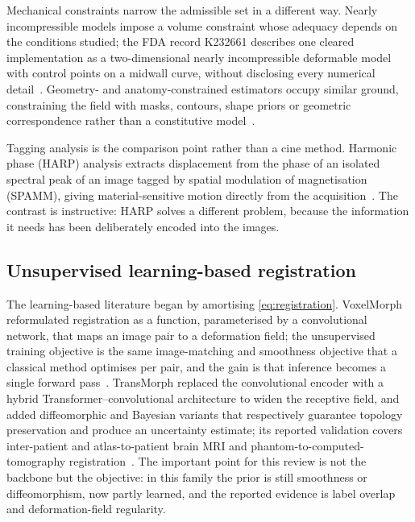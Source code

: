 Mechanical constraints narrow the admissible set in a different way. Nearly incompressible models
impose a volume constraint whose adequacy depends on the conditions studied; the FDA record K232661
describes one cleared implementation as a two-dimensional nearly incompressible deformable model
with control points on a midwall curve, without disclosing every numerical
detail~\citep{fdaK232661}. Geometry- and anatomy-constrained estimators occupy similar ground,
constraining the field with masks, contours, shape priors or geometric correspondence rather than a
constitutive model~\citep{chen2020anatomy,hammouda2020}.

Tagging analysis is the comparison point rather than a cine method. Harmonic phase (HARP) analysis
extracts displacement from the phase of an isolated spectral peak of an image tagged by spatial
modulation of magnetisation (SPAMM), giving material-sensitive
motion directly from the acquisition~\citep{osman2000harp}. The contrast is instructive: HARP solves
a different problem, because the information it needs has been deliberately encoded into the images.

\subsection{Unsupervised learning-based registration}\label{sec:unsupervised}

The learning-based literature began by amortising \cref{eq:registration}. VoxelMorph reformulated
registration as a function, parameterised by a convolutional network, that maps an image pair to a
deformation field; the unsupervised training objective is the same image-matching and smoothness
objective that a classical method optimises per pair, and the gain is that inference becomes a
single forward pass~\citep{balakrishnan2019voxelmorph}. TransMorph replaced the convolutional
encoder with a hybrid Transformer--convolutional architecture to widen the receptive field, and
added diffeomorphic and Bayesian variants that respectively guarantee topology preservation and
produce an uncertainty estimate; its reported validation covers inter-patient and atlas-to-patient
brain MRI and phantom-to-computed-tomography registration~\citep{chen2022transmorph}. The important
point for this review is not the backbone but the objective: in this family the prior is still
smoothness or diffeomorphism, now partly learned, and the reported evidence is label overlap and
deformation-field regularity.


